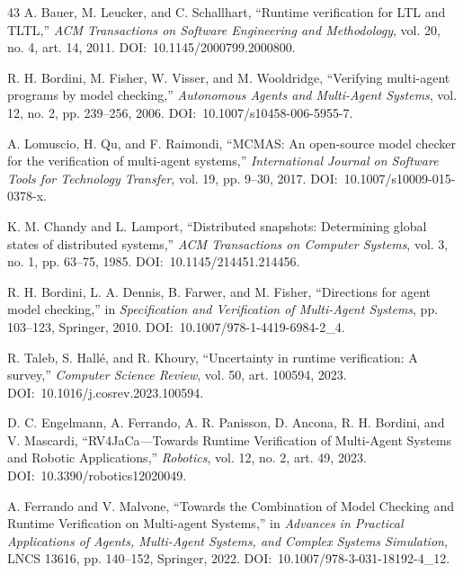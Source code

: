 \documentclass[12pt,a4paper,oneside]{extreport}
\begin{document}
\begin{thebibliography}{43}
A. Bauer, M. Leucker, and C. Schallhart, ``Runtime verification for LTL and TLTL,'' \emph{ACM Transactions on Software Engineering and Methodology}, vol. 20, no. 4, art. 14, 2011. \mbox{DOI: 10.1145/2000799.2000800}.


R. H. Bordini, M. Fisher, W. Visser, and M. Wooldridge, ``Verifying multi-agent programs by model checking,'' \emph{Autonomous Agents and Multi-Agent Systems}, vol. 12, no. 2, pp. 239--256, 2006. \mbox{DOI: 10.1007/s10458-006-5955-7}.


A. Lomuscio, H. Qu, and F. Raimondi, ``MCMAS: An open-source model checker for the verification of multi-agent systems,'' \emph{International Journal on Software Tools for Technology Transfer}, vol. 19, pp. 9--30, 2017. \mbox{DOI: 10.1007/s10009-015-0378-x}.


K. M. Chandy and L. Lamport, ``Distributed snapshots: Determining global states of distributed systems,'' \emph{ACM Transactions on Computer Systems}, vol. 3, no. 1, pp. 63--75, 1985. \mbox{DOI: 10.1145/214451.214456}.


R. H. Bordini, L. A. Dennis, B. Farwer, and M. Fisher, ``Directions for agent model checking,'' in \emph{Specification and Verification of Multi-Agent Systems}, pp. 103--123, Springer, 2010. \mbox{DOI: 10.1007/978-1-4419-6984-2\_4}.


R. Taleb, S. Hallé, and R. Khoury, ``Uncertainty in runtime verification: A survey,'' \emph{Computer Science Review}, vol. 50, art. 100594, 2023. \mbox{DOI: 10.1016/j.cosrev.2023.100594}.


D. C. Engelmann, A. Ferrando, A. R. Panisson, D. Ancona, R. H. Bordini, and V. Mascardi, ``RV4JaCa---Towards Runtime Verification of Multi-Agent Systems and Robotic Applications,'' \emph{Robotics}, vol. 12, no. 2, art. 49, 2023. \mbox{DOI: 10.3390/robotics12020049}.


A. Ferrando and V. Malvone, ``Towards the Combination of Model Checking and Runtime Verification on Multi-agent Systems,'' in \emph{Advances in Practical Applications of Agents, Multi-Agent Systems, and Complex Systems Simulation}, LNCS 13616, pp. 140--152, Springer, 2022. \mbox{DOI: 10.1007/978-3-031-18192-4\_12}.


\end{thebibliography}
\end{document}
